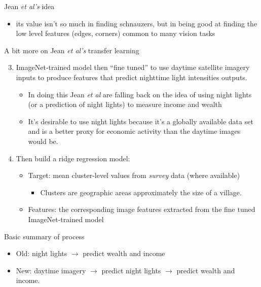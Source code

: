 \documentclass[mathserif, aspectratio=169]{beamer}
\begin{document}
\begin{frame}{Jean \textit{et al's} idea}
\begin{enumerate}
\begin{itemize}
\item its value isn't so much in finding schnauzers, but in being good at finding the low level features (edges, corners) common to many vision tasks
\end{itemize}
\end{enumerate}
\end{frame}

\begin{frame}{A bit more on Jean \textit{et al's} transfer learning}
\begin{enumerate}
 \setcounter{enumi}{2}
\item ImageNet-trained model then ``fine tuned'' to use daytime satellite imagery inputs to produce features that predict nighttime light intensities outputs.
\begin{itemize}
\item In doing this Jean\textit{ et al} are falling back on the idea of using night lights (or a prediction of night lights) to measure income and wealth
\item It's desirable to use night lights because it's a globally available data set and is a better proxy for economic activity than the daytime images would be.
\end{itemize}
\item Then build a ridge regression model:
\begin{itemize}
	\item Target: mean cluster-level values from \textit{survey} data (where available) 
	\begin{itemize}
		\item Clusters are geographic areas approximately the size of a village.
	\end{itemize}
	\item Features: the corresponding image features extracted from the fine tuned ImageNet-trained model  
\end{itemize}
\end{enumerate}
\end{frame}

\begin{frame}{Basic summary of process}

\begin{itemize}
\item Old: night lights $\rightarrow $ predict wealth and income
\item New: daytime imagery $\rightarrow$ predict night lights $\rightarrow$ predict wealth and income.
\end{itemize}

\end{frame}
\end{document}
